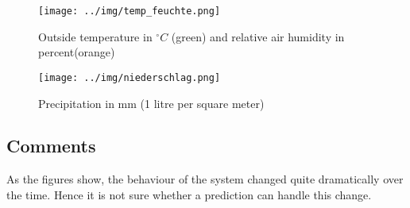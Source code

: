 \documentclass{scrartcl}
\begin{document}
\begin{figure}[H]
  \centering
  \texttt{[image: ../img/temp\_feuchte.png]}
  \caption{Outside temperature in $^\circ C$ (green) and relative air humidity in percent(orange)}
\end{figure}

\begin{figure}[H]
  \centering
  \texttt{[image: ../img/niederschlag.png]}
  \caption{Precipitation in mm (1 litre per square meter)}
\end{figure}

\subsection{Comments}
As the figures show, the behaviour of the system changed quite dramatically over the time. Hence it is not sure whether a prediction can handle this change.






%



%
\end{document}
